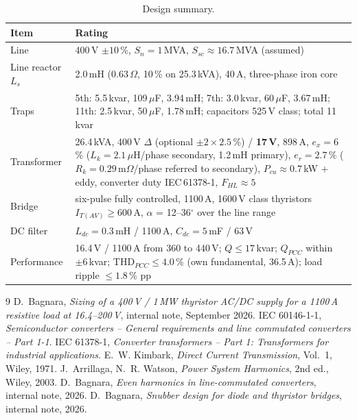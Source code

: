 \documentclass[11pt,a4paper]{article}
\newcommand{\ex}{e_x}
\begin{document}
\begin{table}[h]
\centering
\footnotesize
\begin{tabular}{lp{125mm}}
\toprule
Item & Rating\\
\midrule
Line & 400\,V $\pm10$\,\%, $S_n = 1$\,MVA, $S_{sc} \approx 16.7$\,MVA (assumed)\\
Line reactor $L_s$ & 2.0\,mH (0.63\,$\Omega$, 10\,\% on 25.3\,kVA), 40\,A, three-phase iron core\\
Traps & 5th: 5.5\,kvar, 109\,$\mu$F, 3.94\,mH; 7th: 3.0\,kvar, 60\,$\mu$F, 3.67\,mH; 11th: 2.5\,kvar, 50\,$\mu$F, 1.78\,mH; capacitors 525\,V class; total 11\,kvar\\
Transformer & 26.4\,kVA, 400\,V $\Delta$ (optional $\pm2\times2.5$\,\%) / \textbf{17\,V}, 898\,A, $\ex = 6$\,\% ($L_k = 2.1$\,$\mu$H/phase secondary, 1.2\,mH primary), $e_r = 2.7$\,\% ($R_k = 0.29$\,m$\Omega$/phase referred to secondary), $P_{cu} \approx 0.7$\,kW + eddy, converter duty IEC\,61378-1, $F_{HL} \approx 5$\\
Bridge & six-pulse fully controlled, 1100\,A, 1600\,V class thyristors $I_{T(AV)} \ge 600$\,A, $\alpha$ = 12--36$^\circ$ over the line range\\
DC filter & $L_{dc} = 0.3$\,mH / 1100\,A, $C_{dc} = 5$\,mF / 63\,V\\
Performance & 16.4\,V / 1100\,A from 360 to 440\,V; $Q \le 17$\,kvar; $Q_{PCC}$ within $\pm6$\,kvar; THD$_{PCC} \le 4.0$\,\% (own fundamental, 36.5\,A); load ripple $\le 1.8$\,\% pp\\
\bottomrule
\end{tabular}
\caption{Design summary.}
\end{table}

\begin{thebibliography}{9}
 D.~Bagnara, \emph{Sizing of a 400\,V / 1\,MW thyristor AC/DC supply for a 1100\,A resistive load at 16.4--200\,V}, internal note, September 2026.
 IEC 60146-1-1, \emph{Semiconductor converters -- General requirements and line commutated converters -- Part 1-1}.
 IEC 61378-1, \emph{Converter transformers -- Part 1: Transformers for industrial applications}.
 E.~W. Kimbark, \emph{Direct Current Transmission}, Vol.~1, Wiley, 1971.
 J.~Arrillaga, N.~R. Watson, \emph{Power System Harmonics}, 2nd ed., Wiley, 2003.
 D.~Bagnara, \emph{Even harmonics in line-commutated converters}, internal note, 2026.
 D.~Bagnara, \emph{Snubber design for diode and thyristor bridges}, internal note, 2026.
\end{thebibliography}
\end{document}
